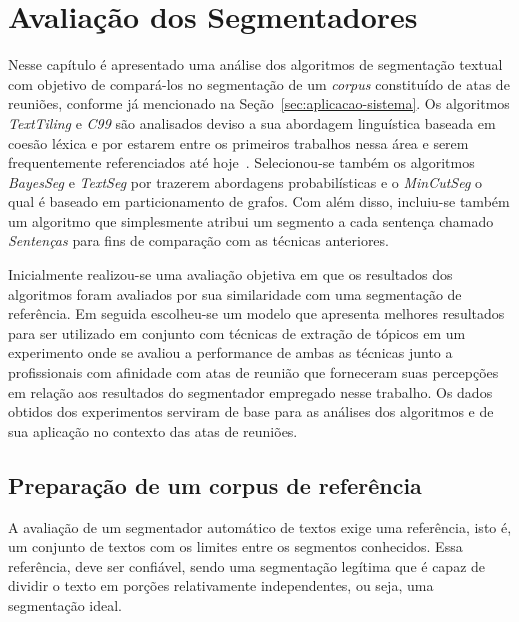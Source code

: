 \chapter{Avaliação dos Segmentadores}\label{cap-segmentadores}




Nesse capítulo é apresentado uma análise dos algoritmos de segmentação textual com objetivo de compará-los no segmentação de um \textit{corpus} constituído de atas de reuniões, conforme já mencionado na Seção~\ref{sec:aplicacao-sistema}. 
%	
Os algoritmos \textit{TextTiling} e \textit{C99} são analisados deviso a sua abordagem linguística baseada em coesão léxica e por estarem entre os primeiros trabalhos nessa área e serem frequentemente referenciados até hoje~\cite{AlemiG15}. 
%	
Selecionou-se também os algoritmos \textit{BayesSeg} e \textit{TextSeg} por trazerem abordagens probabilísticas e o \textit{MinCutSeg} o qual é baseado em particionamento de grafos.
% 
Com além disso, incluiu-se também um algoritmo que simplesmente atribui um segmento a cada sentença chamado \textit{Sentenças} para fins de comparação com as técnicas anteriores.




Inicialmente realizou-se uma avaliação objetiva em que os resultados dos algoritmos foram avaliados por sua similaridade com uma segmentação de referência. Em seguida escolheu-se um modelo que apresenta melhores resultados para ser utilizado em conjunto com técnicas de extração de tópicos em um experimento onde se avaliou a performance de ambas as técnicas junto a profissionais com afinidade com atas de reunião que forneceram suas percepções em relação aos resultados do segmentador empregado nesse trabalho. Os dados obtidos dos experimentos serviram de base para as análises dos algoritmos e de sua aplicação no contexto das atas de reuniões.







\section{Preparação de um corpus de referência}

A avaliação de um segmentador automático de textos exige uma referência, isto é, um conjunto de textos com os limites entre os segmentos conhecidos. Essa referência, deve ser confiável, sendo uma segmentação legítima que é capaz de dividir o texto em porções relativamente independentes, ou seja, uma segmentação ideal.


